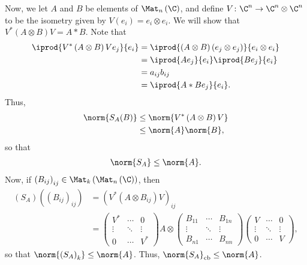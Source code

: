 \documentclass[10pt]{mypackage}
\DeclareMathOperator{\cb}{cb}
\begin{document}
Now, we let $A$ and $B$ be elements of $\Mat_n\left( \C \right)$, and define $V\colon \C^n\rightarrow \C^n\otimes \C^n$ to be the isometry given by $V\left( e_i \right) = e_i\otimes e_i$. We will show that $V^{\ast}\left( A\otimes B \right)V = A\ast B$. Note that
\begin{align*}
  \iprod{V^{\ast}\left( A\otimes B \right)Ve_j}{e_i} &= \iprod{\left( A\otimes B \right)\left( e_j\otimes e_j \right)}{e_i\otimes e_i}\\
                                                     &= \iprod{Ae_j}{e_i} \iprod{Be_j}{e_i}\\
                                                     &= a_{ij}b_{ij}\\
                                                     &= \iprod{A\ast B e_{j}}{e_i}.
\end{align*}
Thus,
\begin{align*}
  \norm{S_A(B)} &\leq \norm{V^{\ast}\left( A\otimes B \right)V}\\
                &\leq \norm{A}\norm{B},
\end{align*}
so that
\begin{align*}
  \norm{S_A}\leq \norm{A}.
\end{align*}
Now, if $\left( B_{ij} \right)_{ij}\in \Mat_k\left( \Mat_n\left( \C \right) \right)$, then
\begin{align*}
  \left( S_{A} \right)\left( \left( B_{ij} \right)_{ij} \right) &= \left( V^{\ast}\left( A\otimes B_{ij} \right)V \right)_{ij}\\
                                                                &= \begin{pmatrix}V^{\ast} & \cdots & 0 \\ \vdots & \ddots & \vdots \\ 0 & \cdots & V^{\ast}\end{pmatrix} A\otimes \begin{pmatrix}B_{11} & \cdots & B_{1n}\\\vdots & \ddots & \vdots \\ B_{n1} & \cdots & B_{nn}\end{pmatrix} \begin{pmatrix}V & \cdots & 0 \\ \vdots & \ddots & \vdots \\ 0 & \cdots & V\end{pmatrix},
\end{align*}
so that $\norm{\left( S_A \right)_k}\leq \norm{A}$. Thus, $\norm{S_A}_{\cb}\leq \norm{A}$.\newline
\end{document}
